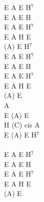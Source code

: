 \documentclass[a5paper, 10pt]{book}
\begin{document}
\begin{minipage}[t]{0.2\textwidth}
  E A E H$^7$\\
  E A E H\\
  E A E H$^7$\\
  E A H E\\
  (A) E H$^7$\\

  E A E H$^7$\\
  E A E H\\
  E A E H$^7$\\
  E A H E\\
  (A) E\\

  A\\
  E (A) E\\
  H (C) cis A\\
  E (A) E H$^7$\\
  \\
  E A E H$^7$\\
  E A E H\\
  E A E H$^7$\\
  E A H E\\
  (A) E\\

\end{minipage}

\newpage
\end{document}
